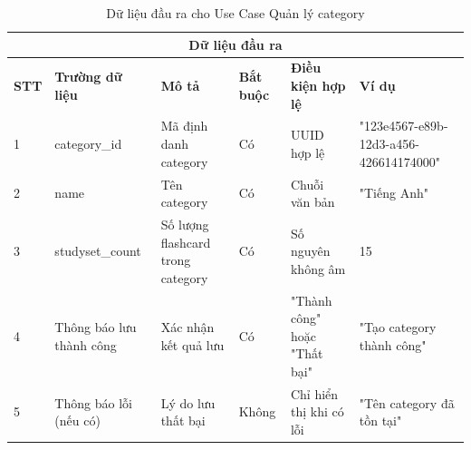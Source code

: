 \documentclass[../DoAn.tex]{subfiles}
\begin{document}
\begin{table}[h!]
\centering
\begin{tabular}{|m{1cm}|m{2.5cm}|m{3cm}|m{1cm}|m{2.5cm}|m{3.5cm}|}
    \hline
    \multicolumn{6}{|c|}{\textbf{Dữ liệu đầu ra}} \\
    \hline
    \textbf{STT} & \textbf{Trường dữ liệu} & \textbf{Mô tả} & \textbf{Bắt buộc} & \textbf{Điều kiện hợp lệ} & \textbf{Ví dụ} \\
    \hline
    1 & category\_id & Mã định danh category & Có & UUID hợp lệ & "123e4567-e89b-12d3-a456-426614174000" \\
    \hline
    2 & name & Tên category & Có & Chuỗi văn bản & "Tiếng Anh" \\
    \hline
    3 & studyset\_count & Số lượng flashcard trong category & Có & Số nguyên không âm & 15 \\
    \hline
    4 & Thông báo lưu thành công & Xác nhận kết quả lưu & Có & "Thành công" hoặc "Thất bại" & "Tạo category thành công" \\
    \hline
    5 & Thông báo lỗi (nếu có) & Lý do lưu thất bại & Không & Chỉ hiển thị khi có lỗi & "Tên category đã tồn tại" \\
    \hline
\end{tabular}
\caption{Dữ liệu đầu ra cho Use Case Quản lý category}
\end{table}
\end{document}
